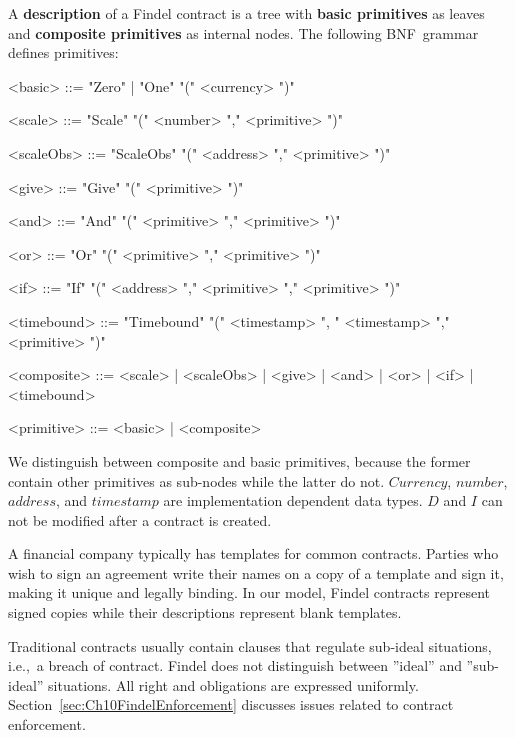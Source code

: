 \begin{definition} \label{def:Ch10FindelDescription}
	A \textbf{description} of a Findel contract is a tree with \textbf{basic primitives} as leaves and \textbf{composite primitives} as internal nodes. The following BNF~grammar defines primitives:
	\begin{grammar}
		
		<basic> ::= "Zero" | "One" "(" <currency> ")"
		
		<scale> ::= "Scale" "(" <number> "," <primitive> ")"
		
		<scaleObs> ::= "ScaleObs" "(" <address> "," <primitive> ")"
		
		<give> ::= "Give" "(" <primitive> ")"
		
		<and> ::= "And" "(" <primitive> "," <primitive> ")"
		
		<or> ::= "Or" "(" <primitive> "," <primitive> ")"
		
		<if> ::= "If" "(" <address> "," <primitive> "," <primitive> ")"
		
		<timebound> ::= "Timebound" "(" <timestamp> ", " <timestamp> "," <primitive> ")"
		
		<composite> ::= <scale> | <scaleObs> | <give> | <and> | <or> | <if> | <timebound>
		
		<primitive> ::= <basic> | <composite>
		
	\end{grammar}
\end{definition}

We distinguish between composite and basic primitives, because the former contain other primitives as sub-nodes while the latter do not.
\(Currency\), \(number\), \(address\), and \(timestamp\) are implementation dependent data types.
$D$ and $I$ can not be modified after a contract is created.

A financial company typically has templates for common contracts.
Parties who wish to sign an agreement write their names on a copy of a template and sign it, making it unique and legally binding.
In our model, Findel contracts represent signed copies while their descriptions represent blank templates.

Traditional contracts usually contain clauses that regulate sub-ideal situations, i.e.,~a breach of contract.
Findel does not distinguish between ''ideal'' and ''sub-ideal'' situations.
All right and obligations are expressed uniformly.
Section~\ref{sec:Ch10FindelEnforcement} discusses issues related to contract enforcement.

